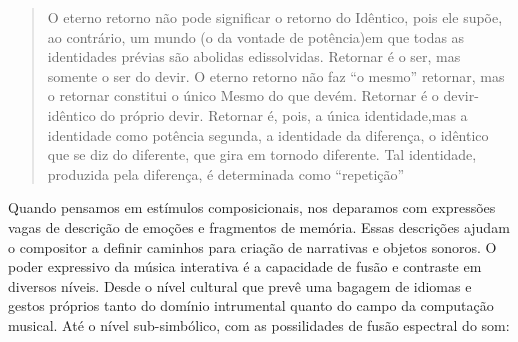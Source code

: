 \documentclass{ppgmus}
\begin{document}
\begin{quotation}
O eterno retorno não pode significar o retorno do Idêntico, pois ele supõe, 
ao contrário, um mundo (o da vontade de potência)em que todas as identidades 
prévias são abolidas edissolvidas. Retornar é o ser, mas somente o ser do devir. 
O eterno retorno não faz “o mesmo” retornar, mas o retornar constitui o único 
Mesmo do que devém. Retornar é o devir-idêntico do próprio devir. Retornar é, 
pois, a única identidade,mas a identidade como potência segunda, a identidade da 
diferença, o idêntico que se diz do diferente, que gira em tornodo diferente. 
Tal identidade, produzida pela diferença, é determinada como “repetição”
\end{quotation}


Quando pensamos em estímulos composicionais, nos deparamos com expressões
vagas de descrição de emoções e fragmentos de memória. Essas descrições
ajudam o compositor a definir caminhos para criação de narrativas e 
objetos sonoros. O poder expressivo da música interativa é a capacidade
de fusão e contraste em diversos níveis. Desde o nível cultural que prevê
uma bagagem de idiomas e gestos próprios tanto do domínio intrumental quanto
do campo da computação musical. Até o nível sub-simbólico, com as possilidades
de fusão espectral do som\cite{menezes2006musica}:
\end{document}
